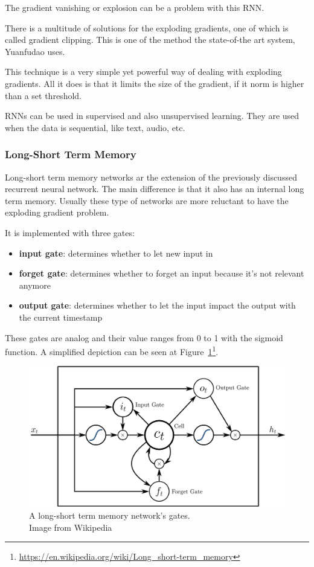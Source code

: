 The gradient vanishing or explosion can be a problem with this RNN.

There is a multitude of solutions for the exploding gradients, one of which is called gradient clipping. This is one of the method the state-of-the art system, Yuanfudao uses.

This technique is a very simple yet powerful way of dealing with exploding gradients. All it does is that it limits the size of the gradient, if it norm is higher than a set threshold.

RNNs can be used in supervised and also unsupervised learning. They are used when the data is sequential, like text, audio, etc.

\subsubsection{Long-Short Term Memory}
Long-short term memory networks ar the extension of the previously discussed recurrent neural network. The main difference is that it also has an internal long term memory. Usually these type of networks are more reluctant to have the exploding gradient problem.

\begin{minipage}{\textwidth}
It is implemented with three gates:
\begin{itemize}
	\item \textbf{input gate}: determines whether to let new input in
	\item \textbf{forget gate}: determines whether to forget an input because it's not relevant anymore
	\item \textbf{output gate}: determines whether to let the input impact the output with the current timestamp
\end{itemize}
\end{minipage}

These gates are analog and their value ranges from 0 to 1 with the sigmoid function. A simplified depiction can be seen at Figure~\ref{fig:lstm}\footnote{\url{https://en.wikipedia.org/wiki/Long_short-term_memory}}.
\begin{figure}[!htb]
	\centering
	\includegraphics[scale=0.2]{lstm.jpg}
	\caption{A long-short term memory network's gates.\\Image from Wikipedia}
	\label{fig:lstm}
\end{figure}

